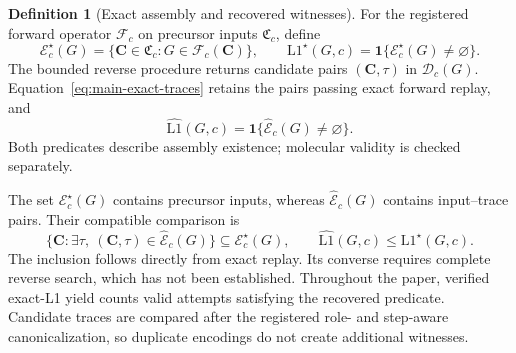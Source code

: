 \documentclass{article}
\theoremstyle{definition}
\newtheorem{definition}[theorem]{Definition}
\begin{document}
\begin{definition}[Exact assembly and recovered witnesses]
\label{def:exact-assembly}
For the registered forward operator $\mathcal F_c$ on precursor inputs $\mathfrak C_c$, define
\begin{equation}
 \mathcal E_c^\star(G)=\{\mathbf C\in\mathfrak C_c:G\in\mathcal F_c(\mathbf C)\},\qquad
 \mathrm{L1}^\star(G,c)=\mathbf1\{\mathcal E_c^\star(G)\neq\varnothing\}.
\end{equation}
The bounded reverse procedure returns candidate pairs $(\mathbf C,\tau)$ in $\mathcal D_c(G)$.
Equation~\ref{eq:main-exact-traces} retains the pairs passing exact forward replay, and
\begin{equation}
 \widehat{\mathrm{L1}}(G,c)=\mathbf1\{\widehat{\mathcal E}_c(G)\neq\varnothing\}.
\end{equation}
Both predicates describe assembly existence; molecular validity is checked separately.
\end{definition}
The set $\mathcal E_c^\star(G)$ contains precursor inputs, whereas
$\widehat{\mathcal E}_c(G)$ contains input--trace pairs. Their compatible comparison is
\begin{equation}
 \{\mathbf C:\exists\tau,\ (\mathbf C,\tau)\in\widehat{\mathcal E}_c(G)\}
 \subseteq\mathcal E_c^\star(G),\qquad
 \widehat{\mathrm{L1}}(G,c)\leq\mathrm{L1}^\star(G,c).
\end{equation}
The inclusion follows directly from exact replay. Its converse requires complete reverse search,
which has not been established. Throughout the paper, verified exact-L1 yield counts valid
attempts satisfying the recovered predicate. Candidate traces are compared after the registered
role- and step-aware canonicalization, so duplicate encodings do not create additional witnesses.
\end{document}
